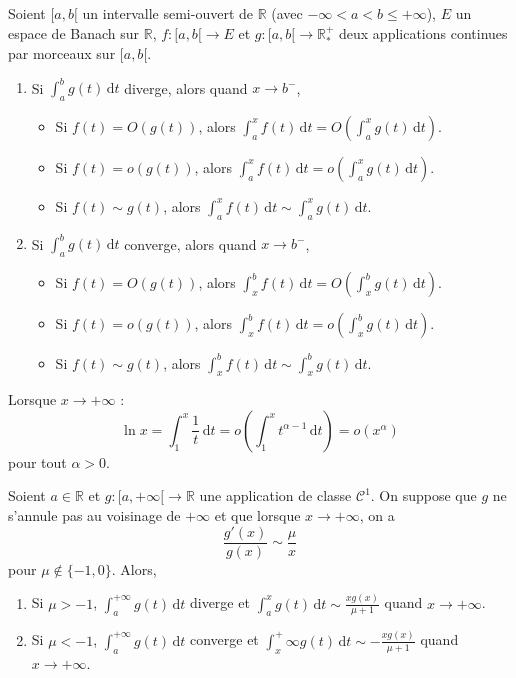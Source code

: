 	\begin{theorem}
		Soient $[a,b[$ un intervalle semi-ouvert de $\mathbb{R}$ (avec $-\infty < a < b \leq +\infty$), $E$ un espace de Banach sur $\mathbb{R}$, $f : [a,b[ \rightarrow E$ et $g : [a,b[ \rightarrow \mathbb{R}^+_*$ deux applications continues par morceaux sur $[a,b[$.
		\begin{enumerate}[label=(\roman*)]
			\item Si $\int_a^b g(t) \, \mathrm{d}t$ diverge, alors quand $x \rightarrow b^-$,
			\begin{itemize}
				\item Si $f(t) = O(g(t))$, alors $\int_a^x f(t) \, \mathrm{d}t = O\left( \int_a^x g(t) \, \mathrm{d}t \right)$.
				\item Si $f(t) = o(g(t))$, alors $\int_a^x f(t) \, \mathrm{d}t = o\left( \int_a^x g(t) \, \mathrm{d}t \right)$.
				\item Si $f(t) \sim g(t)$, alors $\int_a^x f(t) \, \mathrm{d}t \sim \int_a^x g(t) \, \mathrm{d}t$.
			\end{itemize}
			\item Si $\int_a^b g(t) \, \mathrm{d}t$ converge, alors quand $x \rightarrow b^-$,
			\begin{itemize}
				\item Si $f(t) = O(g(t))$, alors $\int_x^b f(t) \, \mathrm{d}t = O\left( \int_x^b g(t) \, \mathrm{d}t \right)$.
				\item Si $f(t) = o(g(t))$, alors $\int_x^b f(t) \, \mathrm{d}t = o\left( \int_x^b g(t) \, \mathrm{d}t \right)$.
				\item Si $f(t) \sim g(t)$, alors $\int_x^b f(t) \, \mathrm{d}t \sim \int_x^b g(t) \, \mathrm{d}t$.
			\end{itemize}
		\end{enumerate}
	\end{theorem}
	
	\begin{example}
		Lorsque $x \rightarrow +\infty$ :
		\[ \ln x = \int_1^x \frac{1}{t} \, \mathrm{d}t = o \left( \int_1^x t^{\alpha-1} \, \mathrm{d}t \right) = o(x^\alpha) \]
		pour tout $\alpha > 0$.
	\end{example}
	
	\begin{application}
		Soient $a \in \mathbb{R}$ et $g : [a, +\infty[ \rightarrow \mathbb{R}$ une application de classe $\mathcal{C}^1$. On suppose que $g$ ne s'annule pas au voisinage de $+\infty$ et que lorsque $x \rightarrow +\infty$, on a
		\[ \frac{g'(x)}{g(x)} \sim \frac{\mu}{x} \]
		pour $\mu \notin \{ -1, 0 \}$. Alors,
		\begin{enumerate}[label=(\roman*)]
			\item Si $\mu > -1$, $\int_a^{+\infty} g(t) \, \mathrm{d}t$ diverge et $\int_a^x g(t) \, \mathrm{d}t \sim \frac{xg(x)}{\mu + 1}$ quand $x \rightarrow +\infty$.
			\item Si $\mu < -1$, $\int_a^{+\infty} g(t) \, \mathrm{d}t$ converge et $\int_x^+\infty g(t) \, \mathrm{d}t \sim -\frac{xg(x)}{\mu + 1}$ quand $x \rightarrow +\infty$.
		\end{enumerate}
	\end{application}
	
